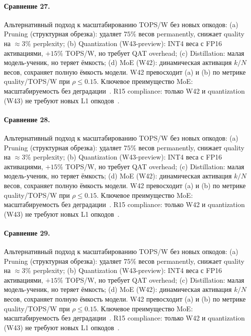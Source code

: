 \paragraph{Сравнение 27.} Альтернативный подход к масштабированию TOPS/W без новых опкодов: (a) Pruning (структурная обрезка): удаляет $75\%$ весов permanently, снижает quality на $\approx 3\%$ perplexity; (b) Quantization (W43-preview): INT4 веса с FP16 активациями, $+15\%$ TOPS/W, но требует QAT overhead; (c) Distillation: малая модель-ученик, но теряет ёмкость; (d) MoE (W42): динамическая активация $k/N$ весов, сохраняет полную ёмкость модели. W42 превосходит (a) и (b) по метрике quality/TOPS/W при $\rho \leq 0{.}15$. Ключевое преимущество MoE: масштабируемость без деградации~\cite{switch_transformer2021,mixtral2024}. R15 compliance: только W42 и quantization (W43) не требуют новых L1 опкодов~\cite{lee_gvsu_proof2021}.

\paragraph{Сравнение 28.} Альтернативный подход к масштабированию TOPS/W без новых опкодов: (a) Pruning (структурная обрезка): удаляет $75\%$ весов permanently, снижает quality на $\approx 3\%$ perplexity; (b) Quantization (W43-preview): INT4 веса с FP16 активациями, $+15\%$ TOPS/W, но требует QAT overhead; (c) Distillation: малая модель-ученик, но теряет ёмкость; (d) MoE (W42): динамическая активация $k/N$ весов, сохраняет полную ёмкость модели. W42 превосходит (a) и (b) по метрике quality/TOPS/W при $\rho \leq 0{.}15$. Ключевое преимущество MoE: масштабируемость без деградации~\cite{switch_transformer2021,mixtral2024}. R15 compliance: только W42 и quantization (W43) не требуют новых L1 опкодов~\cite{lee_gvsu_proof2021}.

\paragraph{Сравнение 29.} Альтернативный подход к масштабированию TOPS/W без новых опкодов: (a) Pruning (структурная обрезка): удаляет $75\%$ весов permanently, снижает quality на $\approx 3\%$ perplexity; (b) Quantization (W43-preview): INT4 веса с FP16 активациями, $+15\%$ TOPS/W, но требует QAT overhead; (c) Distillation: малая модель-ученик, но теряет ёмкость; (d) MoE (W42): динамическая активация $k/N$ весов, сохраняет полную ёмкость модели. W42 превосходит (a) и (b) по метрике quality/TOPS/W при $\rho \leq 0{.}15$. Ключевое преимущество MoE: масштабируемость без деградации~\cite{switch_transformer2021,mixtral2024}. R15 compliance: только W42 и quantization (W43) не требуют новых L1 опкодов~\cite{lee_gvsu_proof2021}.

